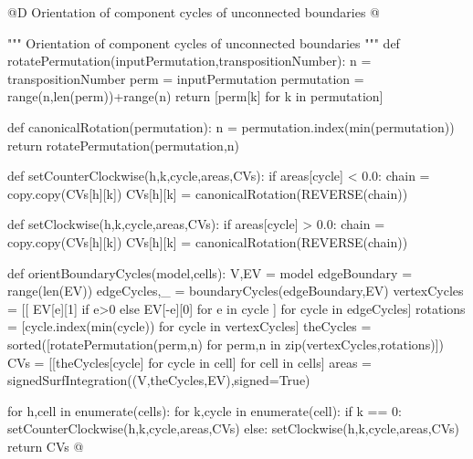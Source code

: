 \documentclass[11pt,oneside]{article}	%
\begin{document}
@D Orientation of component cycles of unconnected boundaries 
@{""" Orientation of component cycles of unconnected boundaries """
def rotatePermutation(inputPermutation,transpositionNumber):
    n = transpositionNumber
    perm = inputPermutation
    permutation = range(n,len(perm))+range(n) 
    return [perm[k] for k in permutation]

def canonicalRotation(permutation):
    n = permutation.index(min(permutation))
    return rotatePermutation(permutation,n)

def setCounterClockwise(h,k,cycle,areas,CVs):
    if areas[cycle] < 0.0: 
        chain = copy.copy(CVs[h][k])
        CVs[h][k] = canonicalRotation(REVERSE(chain))

def setClockwise(h,k,cycle,areas,CVs):
    if areas[cycle] > 0.0: 
        chain = copy.copy(CVs[h][k])
        CVs[h][k] = canonicalRotation(REVERSE(chain))

def orientBoundaryCycles(model,cells):
    V,EV = model
    edgeBoundary = range(len(EV))
    edgeCycles,_ = boundaryCycles(edgeBoundary,EV)
    vertexCycles = [[ EV[e][1] if e>0 else EV[-e][0] for e in cycle ] for cycle in edgeCycles]
    rotations = [cycle.index(min(cycle)) for cycle in vertexCycles]
    theCycles = sorted([rotatePermutation(perm,n) for perm,n in zip(vertexCycles,rotations)])
    CVs = [[theCycles[cycle] for cycle in cell] for cell in cells]
    areas = signedSurfIntegration((V,theCycles,EV),signed=True)
    
    for h,cell in enumerate(cells):
        for k,cycle in enumerate(cell):
            if k == 0: setCounterClockwise(h,k,cycle,areas,CVs)
            else: setClockwise(h,k,cycle,areas,CVs)
    return CVs
@}
\end{document}
